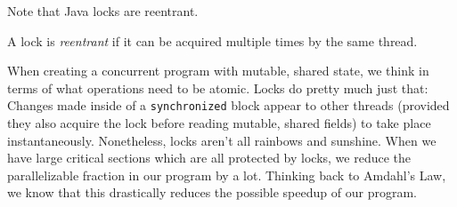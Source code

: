 \documentclass[main]{subfiles}
\begin{document}
Note that Java locks are reentrant.
\begin{definition}
    A lock is \textit{reentrant} if it can be acquired multiple times by the same thread.
\end{definition}
When creating a concurrent program with mutable, shared state, we think in terms of what operations need to be atomic. Locks do pretty much just that: Changes made inside of a \texttt{synchronized} block appear to other threads (provided they also acquire the lock before reading mutable, shared fields) to take place instantaneously. Nonetheless, locks aren't all rainbows and sunshine. When we have large critical sections which are all protected by locks, we reduce the parallelizable fraction in our program by a lot. Thinking back to Amdahl's Law, we know that this drastically reduces the possible speedup of our program.

\end{document}
